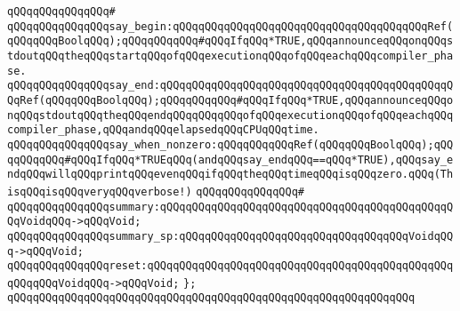 \verb|qQQqqQQqqQQqqQQq#|\newline
\verb|qQQqqQQqqQQqqQQqsay_begin:qQQqqQQqqQQqqQQqqQQqqQQqqQQqqQQqqQQqqQQqRef(qQQqqQQqBoolqQQq);qQQqqQQqqQQq#qQQqIfqQQq*TRUE,qQQqannounceqQQqonqQQqstdoutqQQqtheqQQqstartqQQqofqQQqexecutionqQQqofqQQqeachqQQqcompiler_phase.|\newline
\verb|qQQqqQQqqQQqqQQqsay_end:qQQqqQQqqQQqqQQqqQQqqQQqqQQqqQQqqQQqqQQqqQQqqQQqRef(qQQqqQQqBoolqQQq);qQQqqQQqqQQq#qQQqIfqQQq*TRUE,qQQqannounceqQQqonqQQqstdoutqQQqtheqQQqendqQQqqQQqqQQqofqQQqexecutionqQQqofqQQqeachqQQqcompiler_phase,qQQqandqQQqelapsedqQQqCPUqQQqtime.|\newline
\verb|qQQqqQQqqQQqqQQqsay_when_nonzero:qQQqqQQqqQQqRef(qQQqqQQqBoolqQQq);qQQqqQQqqQQq#qQQqIfqQQq*TRUEqQQq(andqQQqsay_endqQQq==qQQq*TRUE),qQQqsay_endqQQqwillqQQqprintqQQqevenqQQqifqQQqtheqQQqtimeqQQqisqQQqzero.qQQq(ThisqQQqisqQQqveryqQQqverbose!)|\newline
\verb|qQQqqQQqqQQqqQQq#|\newline
\verb|qQQqqQQqqQQqqQQqsummary:qQQqqQQqqQQqqQQqqQQqqQQqqQQqqQQqqQQqqQQqqQQqqQQqVoidqQQq->qQQqVoid;|\newline
\verb|qQQqqQQqqQQqqQQqsummary_sp:qQQqqQQqqQQqqQQqqQQqqQQqqQQqqQQqqQQqVoidqQQq->qQQqVoid;|\newline
\verb|qQQqqQQqqQQqqQQqreset:qQQqqQQqqQQqqQQqqQQqqQQqqQQqqQQqqQQqqQQqqQQqqQQqqQQqqQQqVoidqQQq->qQQqVoid;|\newline
\verb|};|\newline
\newline
\newline
\verb|qQQqqQQqqQQqqQQqqQQqqQQqqQQqqQQqqQQqqQQqqQQqqQQqqQQqqQQqqQQqqQQq|\newline

